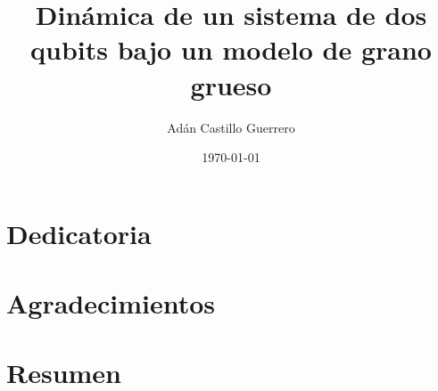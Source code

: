 \documentclass[12pt,twoside]{book}
\title{Dinámica de un sistema de dos qubits bajo un modelo de grano grueso}
\author{Adán Castillo Guerrero}
\date{\today}
\begin{document}
\maketitle
\cleardoublepage

\section*{Dedicatoria}
\cleardoublepage

\section*{Agradecimientos}
\cleardoublepage

\section*{Resumen}

\pagestyle{plain}
\tableofcontents
\newpage





\appendix



\end{document}
